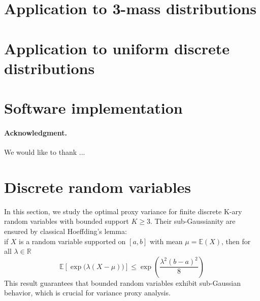 \documentclass[a4paper, 10pt]{article}
\theoremstyle{definition}
\begin{document}
\section{Application to 3-mass distributions}\label{sec:3-mass}

\section{Application to uniform discrete distributions}\label{sec:uniform}

\section{Software implementation}\label{sec:software}


\paragraph{Acknowledgment.}
We would like to thank ...




\appendix

\section{Discrete random variables}
In this section, we study the optimal proxy variance for finite discrete K-ary random variables with bounded support $K \geq 3$. Their sub-Gaussianity are  ensured by classical Hoeffding's lemma:\\
if \(X\)  is a random variable supported on $[a,b]$ with mean $\mu = \mathbb{E}(X)$, then for all $\lambda \in \mathbb{R}$
\begin{equation}
    \mathbb{E}\left[\exp({\lambda (X - \mu))}\right] \leq \exp\left(\frac{\lambda^2 (b-a)^2}{8}\right)
        \label{eq:hoeffdings_lemma}
\end{equation}
This result guarantees that bounded random variables exhibit sub-Gaussian behavior, which is crucial for variance proxy analysis.
\end{document}
